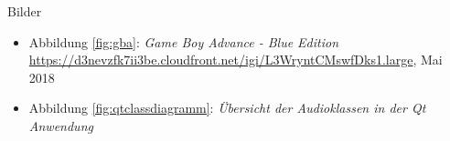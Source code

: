 \documentclass[11pt,a4paper]{scrartcl}
\begin{document}
\huge Bilder
\normalsize

\begin{itemize}
    \item Abbildung \ref{fig:gba}: \textit{Game Boy Advance - Blue Edition}\newline
    \url{https://d3nevzfk7ii3be.cloudfront.net/igi/L3WryntCMswfDks1.large}, Mai 2018
\end{itemize}

\begin{itemize}
    \item Abbildung \ref{fig:qtclassdiagramm}: \textit{\"Ubersicht der Audioklassen in der Qt Anwendung}
\end{itemize}
\end{document}
